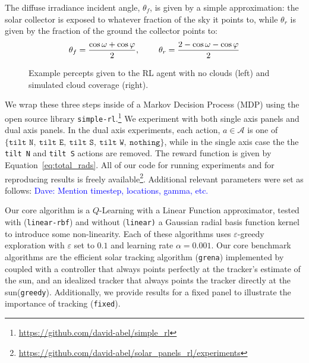 \documentclass[11pt]{article}
\newcommand{\dnote}[1]{\textcolor{blue}{Dave: #1}}
\newcommand{\mc}{\mathcal}
\begin{document}
The diffuse irradiance incident angle, $\theta_f$, is given by a simple approximation: the solar collector is exposed to whatever fraction of the sky it points to, while $\theta_r$ is given by the fraction of the ground the collector points to:
\begin{equation}
\theta_f = \frac{\cos \omega + \cos \varphi}{2}, \hspace{8mm} \theta_r = \frac{2 - \cos\omega - \cos \varphi}{2}
\end{equation}

\begin{figure}[t]
\begin{center}
 \qquad %
\caption{Example percepts given to the RL agent with no clouds (left) and simulated cloud coverage (right).}
\end{center}
\end{figure}

We wrap these three steps inside of a Markov Decision Process (MDP) using the open source library \texttt{simple-rl}.\footnote{\url{https://github.com/david-abel/simple_rl}} We experiment with both single axis panels and dual axis panels. In the dual axis experiments, each action, $a \in \mc{A}$ is one of $\{\texttt{tilt N},\ \texttt{tilt E},\ \texttt{tilt S},\ \texttt{tilt W},\ \texttt{nothing}\}$, while in the single axis case the the \texttt{tilt N} and \texttt{tilt S} actions are removed. The reward function is given by Equation~\ref{eq:total_rads}. All of our code for running experiments and for reproducing results is freely available\footnote{\url{https://github.com/david-abel/solar_panels_rl/experiments}}. Additional relevant parameters were set as follows: \dnote{Mention timestep, locations, gamma, etc.} %

Our core algorithm is a $Q$-Learning with a Linear Function approximator, tested with (\texttt{linear-rbf}) and without (\texttt{linear)} a Gaussian radial basis function kernel to introduce some non-linearity. Each of these algorithms uses $\varepsilon$-greedy exploration with $\varepsilon$ set to $0.1$ and learning rate $\alpha = 0.001$. Our core benchmark algorithms are the efficient solar tracking algorithm (\texttt{grena}) implemented by~\citet{Grena2008} coupled with a controller that always points perfectly at the tracker's estimate of the sun, and an idealized tracker that always points the tracker directly at the sun(\texttt{greedy}). Additionally, we provide results for a fixed panel to illustrate the importance of tracking (\texttt{fixed}).
\end{document}
